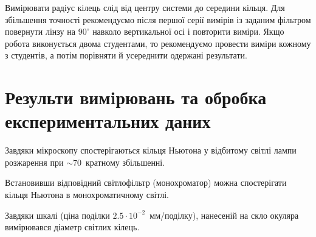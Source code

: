 \documentclass{LabWorkTemplate}
\begin{document}
Вимірювати радіус кілець слід від центру системи до середини кільця. Для збільшення точності рекомендуємо після першої серії вимірів із заданим фільтром повернути лінзу на $90^\circ$ навколо вертикальної осі  і повторити виміри. Якщо робота виконується двома студентами, то рекомендуємо провести виміри кожному з студентів, а потім порівняти й усереднити одержані результати.

\newpage
\section{Результи вимiрювань та обробка експериментальних даних}

Завдяки мікроскопу спостерігаються кільця Ньютона у відбитому світлі лампи розжарення при $\sim 70$~кратному збільшенні.

Встановивши відповідний світлофільтр (монохроматор) можна спостерігати кільця Ньютона в монохроматичному світлі.

Завдяки шкалі (ціна поділки $2.5 \cdot 10^{-2}$~мм/поділку), нанесеній на скло окуляра вимірювався діаметр світлих кілець.

\RedTable
{}\BlueTable
{}\YellowTable

\RedTable
{}\RedTable

\BlueTable
{}\BlueTable


\YellowTable
{}\YellowTable

\end{document}
